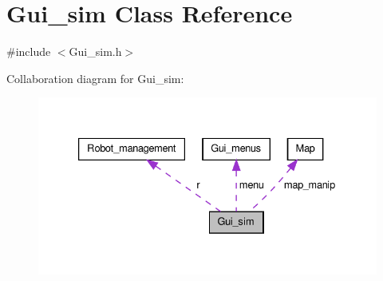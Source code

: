 \hypertarget{class_gui__sim}{\section{Gui\-\_\-sim Class Reference}
\label{class_gui__sim}
}


{\ttfamily \#include $<$Gui\-\_\-sim.\-h$>$}



Collaboration diagram for Gui\-\_\-sim\-:\nopagebreak
\begin{figure}[H]
\begin{center}
\leavevmode
\includegraphics[width=333pt]{class_gui__sim__coll__graph}
\end{center}
\end{figure}
